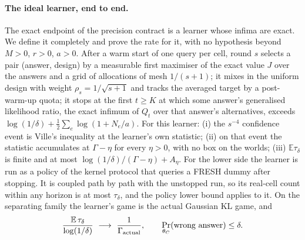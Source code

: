 \paragraph{The ideal learner, end to end.}
The exact endpoint of the precision contract is a learner whose infima are exact. We define
it completely and prove the rate for it, with no hypothesis beyond $M>0$, $r>0$, $a>0$. After
a warm start of one query per cell, round $s$ selects a pair (answer, design) by a
measurable first maximiser of the exact value $J$ over the answers and a grid of allocations
of mesh $1/(s+1)$; it mixes in the uniform design with weight $\rho_{s}=1/\sqrt{s+1}$ and
tracks the averaged target by a post-warm-up quota; it stops at the first $t\ge K$ at which
some answer's generalised likelihood ratio, the exact infimum of $Q_{t}$ over that answer's
alternatives, exceeds $\log(1/\delta)+\tfrac12\sum_{e}\log(1+N_{e}/a)$. For this learner:
(i) the $s^{-4}$ confidence event is Ville's inequality at the learner's own statistic;
(ii) on that event the statistic accumulates at $\Gamma-\eta$ for every $\eta>0$, with no
box on the worlds; (iii) $\mathbb{E}\tau_{\delta}$ is finite and at most
$\log(1/\delta)/(\Gamma-\eta)+A_{\eta}$. For the lower side the learner is run as a policy of
the kernel protocol that queries a FRESH dummy after stopping. It is coupled path by path
with the unstopped run, so its real-cell count within any horizon is at most $\tau_{\delta}$,
and the policy lower bound applies to it. On the separating family the learner's game is the
actual Gaussian KL game, and
\[
\frac{\mathbb{E}\,\tau_{\delta}}{\log(1/\delta)}\ \longrightarrow\ \frac{1}{\Gamma_{\rm actual}},
\qquad \Pr_{\theta_{C}}(\text{wrong answer})\le\delta .
\]



